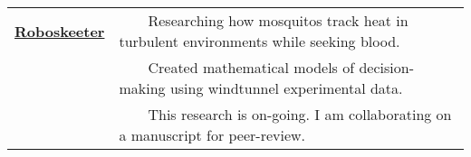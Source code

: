 \documentclass[a4paper,12pt]{article}
\newcommand{\ressubheading}[4]{
        \textbf{#1} \hfill #2\\
        \textit{#3} \hfill #4 \\}
\newcommand{\tabitem}{~~\llap{\textbullet}~~}
\begin{document}

\begin{tabularx}{\textwidth}{p{3cm}>{\arraybackslash}X}
\bfseries{\href{https://github.com/crypdick/RoboSkeeter}{Roboskeeter}} &  \tabitem Researching how mosquitos track heat in turbulent environments while seeking blood. \\
& \tabitem Created mathematical models of decision-making using windtunnel experimental data.\\
& \tabitem This research is on-going. I am collaborating on a manuscript for peer-review.\\
\end{tabularx}

%
    


\end{document}
